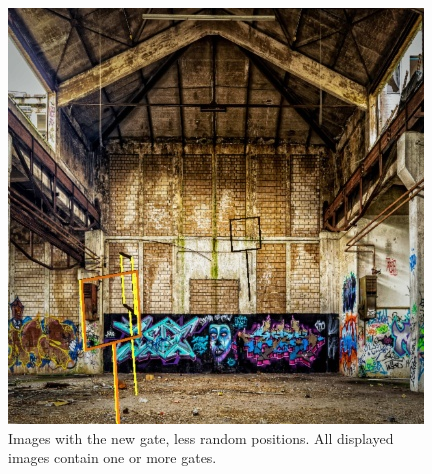 \documentclass{article}
\begin{document}
\begin{figure}[h]
\begin{minipage}{0.24\textwidth}
	\end{minipage}
	\begin{minipage}{0.24\textwidth}
		\centering
		\includegraphics[width=\textwidth]{fig/sample4}
	\end{minipage}
	\caption{Images with the new gate, less random positions. All displayed images contain one or more gates.}
	\label{fig:data}
\end{figure}
\end{document}
